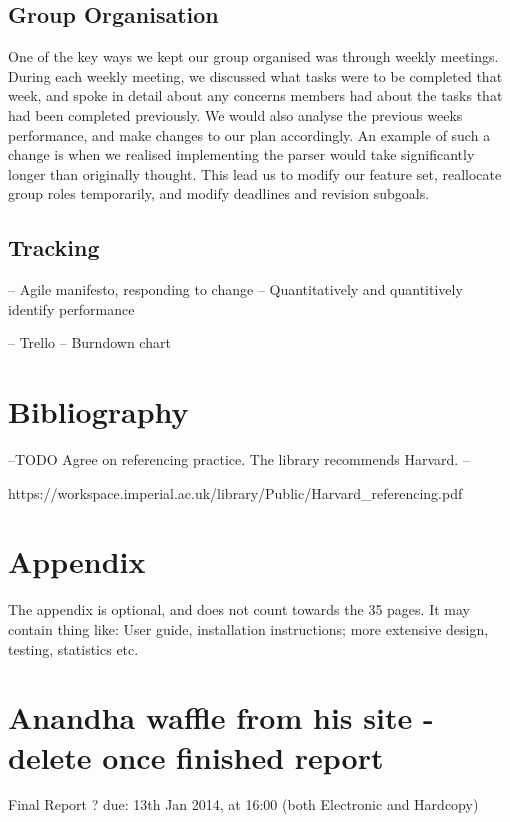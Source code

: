 \documentclass[a4wide, 11pt]{article}
\begin{document}
\subsection{Group Organisation}

One of the key ways we kept our group organised was through weekly meetings.
During each weekly meeting, we discussed what tasks were to be completed that
week, and spoke in detail about any concerns members had about the tasks that
had been completed previously. We would also analyse the previous weeks
performance, and make changes to our plan accordingly. An example of such a
change is when we realised implementing the parser would take significantly
longer than originally thought. This lead us to modify our feature set,
reallocate group roles temporarily, and modify deadlines and revision subgoals.


\subsection{Tracking}

-- Agile manifesto, responding to change
-- Quantitatively and quantitively identify performance

-- Trello
-- Burndown chart

\section{Bibliography}

\printbibliography

--TODO Agree on referencing practice. The library recommends Harvard. --

https://workspace.imperial.ac.uk/library/Public/Harvard\_referencing.pdf

\section{Appendix}

The appendix is optional, and does not count towards the 35 pages. It may contain thing like: User guide, installation instructions; more extensive design, testing, statistics etc.

\section{Anandha waffle from his site - delete once finished report}

Final Report ? due: 13th Jan 2014, at 16:00 (both Electronic and Hardcopy)
\end{document}
